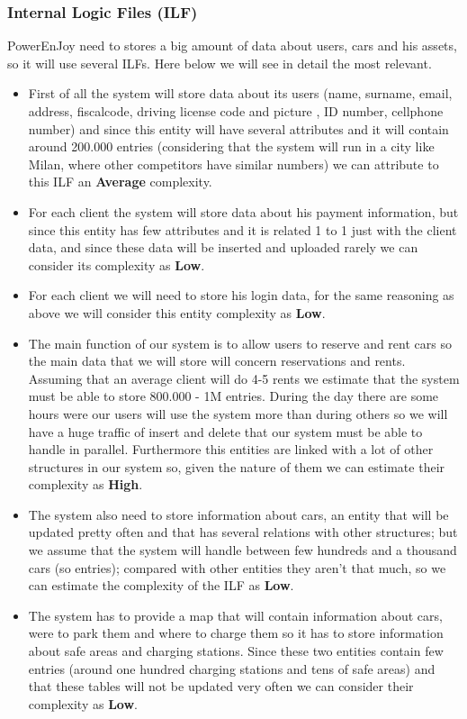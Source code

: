 \subsubsection{Internal Logic Files (ILF)}
PowerEnJoy need to stores a big amount of data about users, cars and his  assets, so it will use several ILFs. Here below we will see in detail the most relevant.
\begin{itemize}

\item First of all the system will store data about its users (name, surname, email, address, fiscalcode, driving license code and picture ,  ID number, cellphone number) and since this entity will have several attributes  and it will contain around 200.000 entries (considering that the system will run in a city like Milan, where other competitors have similar numbers) we can attribute to this ILF an \textbf{Average} complexity.\\
\item For each client  the system will store data about his payment information, but since this entity has few attributes and it is related 1 to 1  just with the client data, and since these data will be inserted and uploaded rarely we can consider its complexity as \textbf{Low}.\\
\item For each client we will need to store his login data, for the same reasoning as above we will consider this entity complexity as \textbf{Low}.\\
\item The main function of our system is to allow users to reserve and rent cars so the main data that we will store will concern reservations and rents. Assuming that an average client will do 4-5 rents we estimate that the system must be able to store 800.000 - 1M entries. During the day there are some hours were our users will use the system more than during others so we will have a huge traffic of insert and delete that our system must be able to handle in parallel. Furthermore this entities are linked with a lot of other structures in our system so, given the nature of them we can estimate  their complexity as \textbf{High}.\\
\item The system also need to store information about cars, an entity that will be updated pretty often and that has several relations with other structures; but we assume that the system will handle between few hundreds and a thousand cars (so entries); compared with other entities they aren't that much, so  we can estimate the complexity of the ILF as \textbf{Low}.\\
\item The system has to provide a map that will contain information about cars,  were to park them and where to charge them so it has to store information about safe areas and charging stations.  Since these two entities contain few entries (around one hundred charging stations and  tens of safe areas) and that these tables will not be updated very often we can consider their complexity as \textbf{Low}.\\
\end{itemize}
